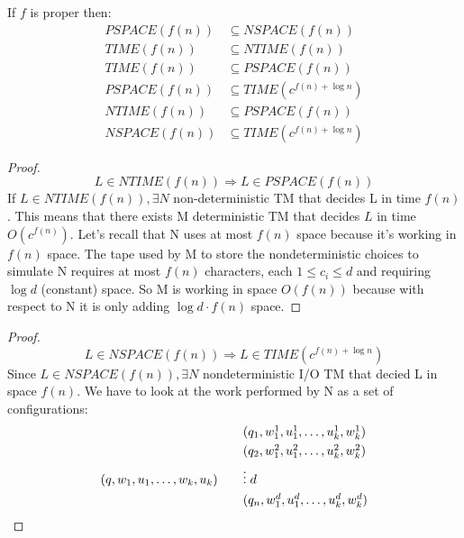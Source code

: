 \begin{theorem}
    If $f$ is proper then:
    \begin{align*}
        PSPACE(f(n)) &\subseteq NSPACE(f(n)) \\
        TIME(f(n)) &\subseteq NTIME(f(n)) \\
        TIME(f(n)) & \subseteq PSPACE(f(n)) \\
        PSPACE(f(n)) &\subseteq TIME(c^{f(n)+\log{n}})\\
        NTIME(f(n)) & \subseteq PSPACE(f(n)) \\
        NSPACE(f(n)) &\subseteq TIME(c^{f(n)+\log{n}})
    \end{align*}
    \begin{proof}
        \[ 
             L \in NTIME(f(n)) \Longrightarrow L\in PSPACE(f(n))
        \]
        If $L \in NTIME(f(n)), \exists N$ non-deterministic TM that decides L in time $f(n)$. This means that there exists M deterministic TM that decides $L$ in time $O(c^{f(n)})$. Let's recall that N uses at most $f(n)$ space because it's working in $f(n)$ space. The tape used by M to store the nondeterministic choices to simulate N requires at most $f(n)$ characters, each $1 \leq c_i \leq d$ and requiring $\log{d}$ (constant) space. So M is working in space $O(f(n))$ because with respect to N it is only adding $\log{d}\cdot f(n)$ space.
    \end{proof}
    \begin{proof}
        \[ 
            L \in NSPACE(f(n)) \Longrightarrow L \in TIME(c^{f(n)+\log{n}})
        \]
        Since $ L \in NSPACE(f(n)), \exists N$ nondeterministic I/O TM that decied L in space $f(n)$. We have to look at the work performed by N as a set of configurations:
        \begin{align*}
            &\qquad\tikznode{1}{$(q_1, w_{1}^1,u_{1}^1, \ldots,u_{k}^1,w_{k}^1)$}\\
            &\qquad\tikznode{2}{$(q_2, w_{1}^2,u_{1}^2, \ldots,u_{k}^2,w_{k}^2)$}\\
            \tikznode{0}{$(q,w_1,u_1,\ldots,w_k, u_k)$}&\qquad \vdots \; d\\
            &\qquad\tikznode{d}{$(q_n, w_{1}^d,u_{1}^d, \ldots,u_{k}^d,w_{k}^d)$}\\
        \end{align*}
\end{proof}
\end{theorem}
